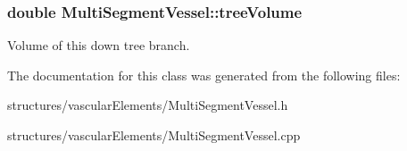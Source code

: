 \subsubsection[{\texorpdfstring{tree\+Volume}{treeVolume}}]{\setlength{\rightskip}{0pt plus 5cm}double Multi\+Segment\+Vessel\+::tree\+Volume}\hypertarget{class_multi_segment_vessel_af4b7aed9f6b921d4b33ceea99c813952}{}\label{class_multi_segment_vessel_af4b7aed9f6b921d4b33ceea99c813952}
Volume of this down tree branch. 

The documentation for this class was generated from the following files\+:\begin{DoxyCompactItemize}
\item 
structures/vascular\+Elements/Multi\+Segment\+Vessel.\+h\item 
structures/vascular\+Elements/Multi\+Segment\+Vessel.\+cpp\end{DoxyCompactItemize}
